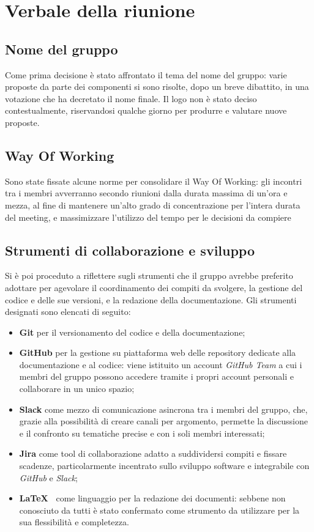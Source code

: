 \section{Verbale della riunione}
\subsection{Nome del gruppo}
Come prima decisione è stato affrontato il tema del nome del gruppo: varie proposte da parte dei componenti si sono risolte, dopo un breve dibattito, in una votazione che ha decretato il nome finale. Il logo non è stato deciso contestualmente, riservandosi qualche giorno per produrre e valutare nuove proposte.

\subsection{Way Of Working}
Sono state fissate alcune norme per consolidare il Way Of Working: gli incontri tra i membri avverranno secondo riunioni dalla durata massima di un'ora e mezza, al fine di mantenere un'alto grado di concentrazione per l'intera durata del meeting, e massimizzare l'utilizzo del tempo per le decisioni da compiere

\subsection{Strumenti di collaborazione e sviluppo}
Si è poi proceduto a riflettere sugli strumenti che il gruppo avrebbe preferito adottare per agevolare il coordinamento dei compiti da svolgere, la gestione del codice e delle sue versioni, e la redazione della documentazione.
Gli strumenti designati sono elencati di seguito:

\begin{itemize}
	\item \textbf{Git} per il versionamento del codice e della documentazione;
	\item \textbf{GitHub} per la gestione su piattaforma web delle repository dedicate alla documentazione e al codice: viene istituito un account \textit{GitHub Team} a cui i membri del gruppo possono accedere tramite i propri account personali e collaborare in un unico spazio;
	\item \textbf{Slack} come mezzo di comunicazione asincrona tra i membri del gruppo, che, grazie alla possibilità di creare canali per argomento, permette la discussione e il confronto su tematiche precise e con i soli membri interessati;
	\item \textbf{Jira} come tool di collaborazione adatto a suddividersi compiti e fissare scadenze, particolarmente incentrato sullo sviluppo software  e integrabile con \textit{GitHub} e \textit{Slack}; 
	\item \textbf{\LaTeX\ } come linguaggio per la redazione dei documenti: sebbene non conosciuto da tutti è stato confermato come strumento da utilizzare per la sua flessibilità e completezza.
\end{itemize}

